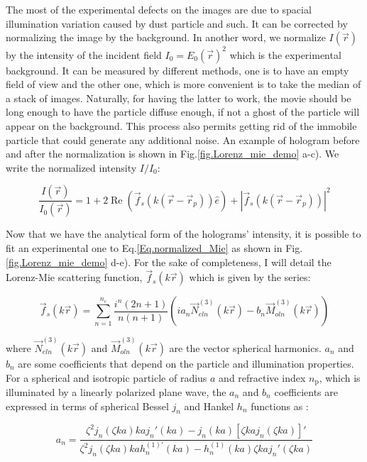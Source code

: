 The most of the experimental defects on the images are due to spacial illumination variation caused by dust particle and such. It can be corrected by normalizing the image by the background. In another word, we normalize  $I(\vec{r})$ by the intensity of the incident field $I_0 = E_0(\vec{r})^2$ which is the experimental background. It can be measured by different methods, one is to have an empty field of view and the other one, which is more convenient is to take the median of a stack of images. Naturally, for having the latter to work, the movie should be long enough to have the particle diffuse enough, if not a ghost of the particle will appear on the background. This process also permits getting rid of the immobile particle that could generate any additional noise. An example of hologram before and after the normalization is shown in Fig.\ref{fig.Lorenz_mie_demo} a-c). We write the normalized intensity $I/I_0$:

\begin{equation}
	\frac{I(\vec{r})}{I_0(\vec{r})} = 1 + 2 \operatorname{Re} 
	\left(  
		\vec{f}_s(k(\vec{r}- \vec{r}_p)) \hat{e}
	\right)
	+
	|
		\vec{f}_s(k(\vec{r}- \vec{r}_p))
	|^2
	\label{Eq.normalized_Mie}	
\end{equation}


Now that we have the analytical form of the holograms' intensity, it is possible to fit an experimental one to Eq.\ref{Eq.normalized_Mie} as shown in Fig.\ref{fig.Lorenz_mie_demo} d-e). For the sake of completeness, I will detail the Lorenz-Mie scattering function, $\vec{f}_s(k\vec{r})$ which is given by the series:

\begin{equation}
	\vec{f}_s(k \vec{r}) = \sum _{n=1} ^{n_c} 
	\frac
	{
		i^n (2n +1)
	}
	{
		n(n+1)
	}
	\left(
		i a_n \vec{N}^{(3)}_{eln}(k\vec{r})
		-
		b_n \vec{M}^{(3)}_{oln}(k\vec{r})
	\right)
	\label{Eq.Lorenz-Mie-function}
\end{equation} 


where $\vec{N}^{(3)}_{eln}(k\vec{r})$ and $\vec{M}^{(3)}_{oln}(k\vec{r})$ are the vector spherical harmonics. $a_n$ and $b_n$ are some coefficients that depend on the particle and illumination properties. For a spherical and isotropic particle of radius $a$ and refractive index $n_\mathrm{p}$, which is illuminated by a linearly polarized plane wave, the $a_n$ and $b_n$ coefficients are expressed in terms of spherical Bessel $j_n$ and Hankel $h_n$ functions as \cite{f_bohren_absorption_1998}:

\begin{equation}
	a_n = 
	\frac
	{
		\zeta^2 j_n (\zeta k a)k a j_n' (k a) - j_n(ka)[\zeta kaj_n(\zeta ka)]'
	}
	{
		\zeta^2 j_n (\zeta k a)k a h_n^{(1)'} (k a) - h_n^{(1)}(ka)\zeta kaj_n'(\zeta ka)
	}
\end{equation}

